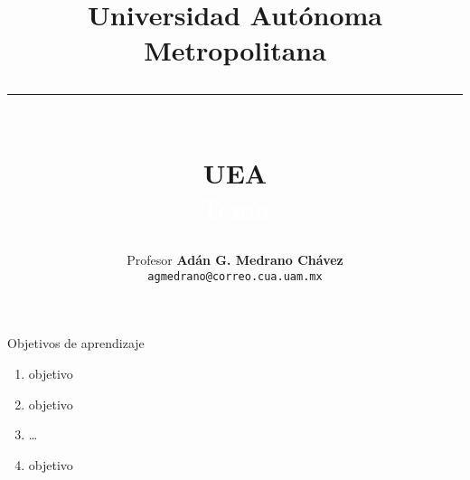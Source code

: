 \documentclass[table,dvipsnames,aspectratio=169]{beamer}
\title{{\LARGE Universidad Autónoma Metropolitana}\\
       \noindent\textcolor{Cua}{\rule{0.9\textwidth}{1mm}}\\
       {\large UEA}\\
       \textcolor{white}{Tema}\\
      }
\author[Adán G. Medrano-Chávez]{
    \small 
    Profesor \textbf{Adán G. Medrano Chávez}\\
    \texttt{agmedrano@correo.cua.uam.mx}
}
\date{}
\begin{document}
\begin{frame}[t,plain]
  \titlepage
\end{frame}

\begin{frame}{Objetivos de aprendizaje}
    \begin{singlecol}[0.5]
        \begin{enumerate}
          \item objetivo
          \item objetivo
          \item \ldots
          \item objetivo
        \end{enumerate}
    \end{singlecol}
\end{frame}
\end{document}
